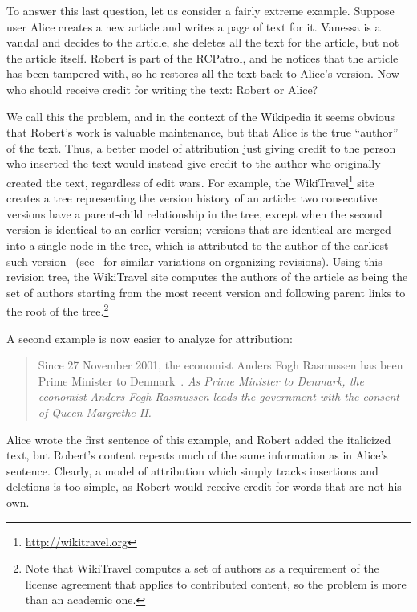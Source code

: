 To answer this last question, let us consider a fairly extreme example.
Suppose user Alice creates a new article and writes a page of text for it.
Vanessa is a vandal and decides to  the article,
\ie she deletes all the text for the article, but not the article itself.
Robert is part of the RCPatrol, and he notices that the article has
been tampered with, so he restores all the text back to Alice's version.
Now who should receive credit for writing the text: Robert or Alice?

We call this the  problem,
and in the context of the Wikipedia it seems obvious that Robert's
work is valuable maintenance, but that Alice is the true ``author'' of the text.
Thus, a better model of attribution just giving credit
to the person who inserted the text would instead give credit
to the author who originally created the text,
regardless of edit wars.
For example, the WikiTravel\footnote{\url{http://wikitravel.org}}
site creates a tree representing
the version history of an article: two consecutive versions
have a parent-child relationship in the tree, except when
the second version is identical to an earlier version;
versions that are identical are merged into a single node
in the tree, which is attributed to the author of the earliest
such version~\cite{WikiTravelAuthorship}
(see~\cite{Ekstrand2009,Sabel2007} for similar variations
on organizing revisions).
Using this revision tree, the WikiTravel site computes the
authors of the article as being the set of authors starting
from the most recent version and following parent links
to the root of the tree.\footnote{Note that WikiTravel
computes a set of authors as a requirement
of the license agreement that applies to contributed content,
so the problem is more than an academic one.}


A second example is now easier to analyze for attribution:
%
\begin{quote}
Since 27 November 2001, the economist Anders Fogh Rasmussen
has been Prime Minister to Denmark~\cite{wiki:Denmark-Fogh}.
\textit{As Prime Minister to Denmark, the economist Anders Fogh Rasmussen
leads the government with the consent of Queen Margrethe II.}
\end{quote}
%
Alice wrote the first sentence of this example, and Robert
added the italicized text,
but Robert's content repeats much of the same information as
in Alice's sentence.
Clearly, a model of attribution which simply tracks insertions
and deletions is too simple, as Robert
would receive credit for words that are not his own.


